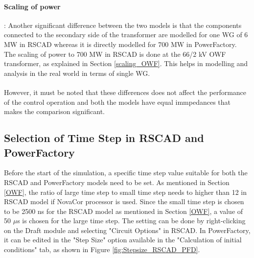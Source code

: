 \paragraph{Scaling of power}: Another significant difference between the two models is that the components connected to the secondary side of the transformer are modelled for one \gls{WG} of 6 MW in RSCAD whereas it is directly modelled for 700 MW in PowerFactory. The scaling of power to 700 MW in RSCAD is done at the 66/2 kV \gls{OWF} transformer, as explained in Section \ref{scaling_OWF}. This helps in modelling and analysis in the real world in terms of single \gls{WG}.
\vspace{-3mm}
\paragraph{}
However, it must be noted that these differences does not affect the performance of the control operation and both the models have equal immpedances that makes the comparison significant. 

\subsection{Selection of Time Step in RSCAD and PowerFactory}
Before the start of the simulation, a specific time step value suitable for both the RSCAD and PowerFactory models need to be set. As mentioned in Section \ref{OWF}, the ratio of large time step to small time step needs to higher than 12 in RSCAD model if NovaCor processor is used. Since the small time step is chosen to be 2500 ns for the RSCAD model as mentioned in Section \ref{OWF}, a value of 50 $\mu$s is chosen for the large time step. The setting can be done by right-clicking on the Draft module and selecting "Circuit Options" in RSCAD. In PowerFactory, it can be edited in the "Step Size" option available in the "Calculation of initial conditions" tab, as shown in Figure \ref{fig:Stepsize_RSCAD_PFD}.  

